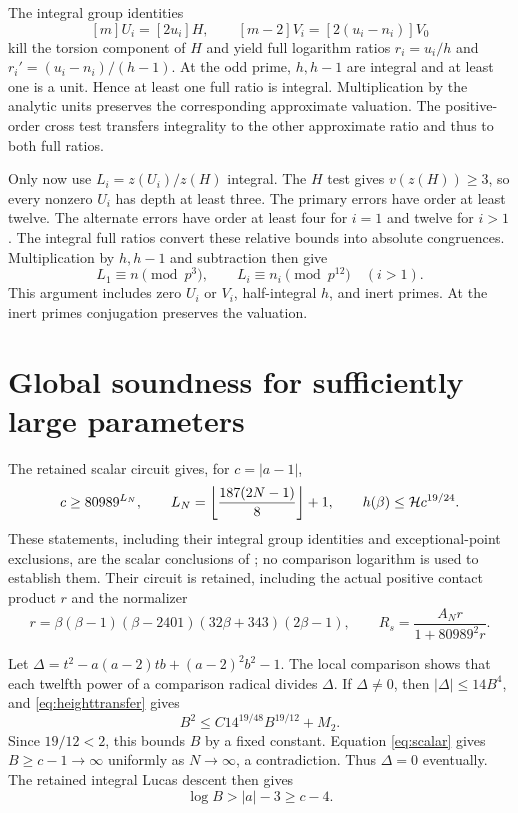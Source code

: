 \documentclass[11pt,a4paper]{article}
\begin{document}
The integral group identities
\[
 [m]U_i=[2u_i]H,\qquad
 [m-2]V_i=[2(u_i-n_i)]V_0
\]
kill the torsion component of $H$ and yield full logarithm ratios
$r_i=u_i/h$ and $r_i'=(u_i-n_i)/(h-1)$.
At the odd prime, $h,h-1$ are integral and at least one is a unit.
Hence at least one full ratio is integral. Multiplication by the
analytic units preserves the corresponding approximate valuation.
The positive-order cross test transfers integrality to the other
approximate ratio and thus to both full ratios.

Only now use $L_i=z(U_i)/z(H)$ integral. The $H$ test gives
$v(z(H))\ge3$, so every nonzero $U_i$ has depth at least three.
The primary errors have order at least twelve. The alternate errors
have order at least four for $i=1$ and twelve for $i>1$.
The integral full ratios convert these relative bounds into absolute
congruences. Multiplication by $h,h-1$ and subtraction then give
\[
 L_1\equiv n\pmod{p^3},\qquad
 L_i\equiv n_i\pmod{p^{12}}\quad(i>1).
\]
This argument includes zero $U_i$ or $V_i$, half-integral $h$, and
inert primes. At the inert primes conjugation preserves the valuation.

\section{Global soundness for sufficiently large parameters}\label{sec:soundness}
The retained scalar circuit gives, for $c=|a-1|$,
\begin{equation}\label{eq:scalar}
 c\ge80989^{L_N},\qquad
 L_N=\left\lfloor\frac{187(2N-1)}8\right\rfloor+1,
 \qquad h(\beta)\le\mathcal H c^{19/24}.
\end{equation}
These statements, including their integral group identities and
exceptional-point exclusions, are the scalar conclusions of
\cite{Source}; no comparison logarithm is used to establish them.
Their circuit is retained, including the actual positive contact
product $r$ and the normalizer
\[
 r=\beta(\beta-1)(\beta-2401)(32\beta+343)(2\beta-1),
 \qquad R_s=\frac{A_Nr}{1+80989^2r}.
\]

Let
$\Delta=t^2-a(a-2)tb+(a-2)^2b^2-1$.
The local comparison shows that each twelfth power of a comparison
radical divides $\Delta$. If $\Delta\ne0$, then
$|\Delta|\le14B^4$, and \eqref{eq:heighttransfer} gives
\[
                  B^2\le C14^{19/48}B^{19/12}+M_2.
\]
Since $19/12<2$, this bounds $B$ by a fixed constant. Equation
\eqref{eq:scalar} gives $B\ge c-1\to\infty$ uniformly as
$N\to\infty$, a contradiction. Thus $\Delta=0$ eventually.
The retained integral Lucas descent then gives
\[
                         \log B>|a|-3\ge c-4.
\]
\end{document}
